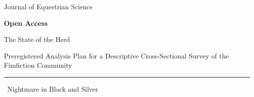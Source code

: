 \noindent
\begin{minipage}[t]{0.25\textwidth}
	\centering
	
	\vspace{0pt}
	
	
	
	\vspace{0.2cm}
	
	{\footnotesize
		Journal of Equestrian Science \parencite{vaderpl_rainbow_dash_twilight_sparkle}
	}
\end{minipage}
\hfill
\begin{minipage}[t]{0.70\textwidth}
	\vspace{0pt}
	
	 {\small\bfseries Open Access\par}
	
	\vspace{0.3cm}
	
	{\equestriafont\fontsize{30pt}{34pt}\selectfont\color{twilighteyes} The State of the Herd\par}
	
	\vspace{0.4cm}
	
	{\large
		Preregistered Analysis Plan for a Descriptive
		Cross-Sectional Survey of the Fimfiction Community\par
	}
	
	\vspace{0.5cm}
	
	\hrule
	
	\vspace{0.5cm}
	
	\moonbullet~Nightmare in Black and Silver
\end{minipage}